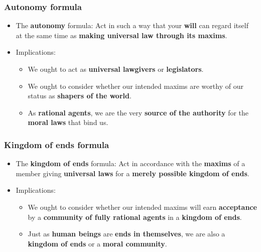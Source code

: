 \documentclass[11pt]{article}
\begin{document}
\subsubsection{Autonomy formula}
\label{sec:org9f58ad1}
\begin{itemize}
\item The \textbf{autonomy} formula:
Act in such a way that your \textbf{will} can regard itself at the same time as \textbf{making universal law through its maxims}.
\item Implications:
\begin{itemize}
\item We ought to act as \textbf{universal lawgivers} or \textbf{legislators}.
\item We ought to consider whether our intended maxims are worthy of our status as \textbf{shapers of the world}.
\item As \textbf{rational agents}, we are the very \textbf{source of the authority} for the \textbf{moral laws} that bind us.
\end{itemize}
\end{itemize}
\subsubsection{Kingdom of ends formula}
\label{sec:orgad7bc41}
\begin{itemize}
\item The \textbf{kingdom of ends} formula:
Act in accordance with the \textbf{maxims} of a member giving \textbf{universal laws} for a \textbf{merely possible kingdom of ends}.
\item Implications:
\begin{itemize}
\item We ought to consider whether our intended maxims will earn \textbf{acceptance} by a \textbf{community of fully rational agents} in a \textbf{kingdom of ends}.
\item Just as \textbf{human beings} are \textbf{ends in themselves}, we are also a \textbf{kingdom of ends} or a \textbf{moral community}.
\end{itemize}
\end{itemize}

 \newpage
\end{document}
